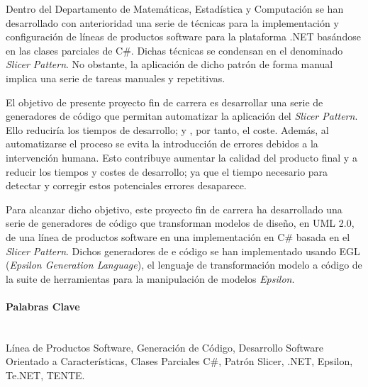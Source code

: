 

Dentro del Departamento de Matemáticas, Estadística y Computación se han desarrollado con anterioridad una serie de técnicas para la implementación y configuración de líneas de productos software para la plataforma .NET basándose en las clases parciales de C\#. Dichas técnicas se condensan en el denominado \emph{Slicer Pattern}. No obstante, la aplicación de dicho patrón de forma manual implica una serie de tareas manuales y repetitivas. 

El objetivo de presente proyecto fin de carrera es desarrollar una serie de generadores de código que permitan automatizar la aplicación del \emph{Slicer Pattern}. Ello reduciría los tiempos de desarrollo; y , por tanto, el coste. Además, al automatizarse el proceso se evita la introducción de errores debidos a la intervención humana. Esto contribuye aumentar la calidad del producto final y a reducir los tiempos y costes de desarrollo; ya que el tiempo necesario para detectar y corregir estos potenciales errores desaparece.

Para alcanzar dicho objetivo, este proyecto fin de carrera ha desarrollado una serie de generadores de código que transforman modelos de diseño, en UML 2.0, de una línea de productos software en una implementación en C\# basada en el \emph{Slicer Pattern}. Dichos generadores de e código se han implementado usando EGL (\emph{Epsilon Generation Language}), el lenguaje de transformación modelo a código de la suite de herramientas para la manipulación de modelos \emph{Epsilon}.

\paragraph{Palabras Clave} \ \\

Línea de Productos Software, Generación de Código, Desarrollo Software Orientado a Características, Clases Parciales C\#, Patrón Slicer, .NET, Epsilon, Te.NET, TENTE. 




